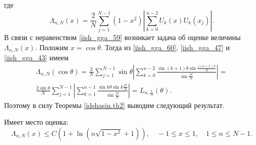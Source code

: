 где
\begin{equation}
  \Lambda_{n,N}(x)=\frac2N\sum\limits_{j=1}^{N-1}(1-x^2)
  \left| \sum\limits_{k=0}^{n-2}U_k(x)U_k(x_j) \right|. \label{iish_gga_60}
\end{equation}
В связи с неравенством \eqref{iish_gga_59} возникает задача об оценке величины $\Lambda_{n,N}(x)$. Положим $x=\cos\theta$.
Тогда из \eqref{iish_gga_60}, \eqref{iish_gga_47} и \eqref{iish_gga_43} имеем
\begin{multline}
  \Lambda_{n,N}(\cos\theta)=\frac2N\sum\limits_{j=1}^{N-1}\sin\theta
  \left|
  \sum\limits_{k=0}^{n-2}\frac{\sin(k+1)\theta\sin\frac{j(k+1)\pi}{N}}{\sin\frac{j\pi}{N}}
  \right| = \\
  \frac{2\sin\theta}{N}\sum\limits_{j=1}^{N-1}
  \left|
  \sum\limits_{k=1}^{n-1}\frac{\sin k\theta\sin k\frac{j\pi}{N}}{\sin\frac{j\pi}{N}}
  \right| = L_{n,\frac{\pi}{N}}(\theta). \label{iish_gga_61}
\end{multline}
Поэтому в силу  Теоремы \ref{idshasin.th2} выводим следующий результат.

\begin{theorem}
\label{idshasin.th2}
 Имеет место оценка:
\begin{equation*}
  \Lambda_{n,N}(x) \leq C(1+\ln(n\sqrt{1-x^2}+1)), \quad -1 \leq x \leq 1, \quad 1 \leq n \leq N-1.
\end{equation*}
\end{theorem}
